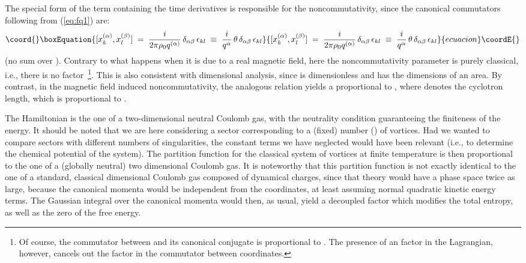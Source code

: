 \documentclass[a4paper,12pt]{article} \tolerance=200
\begin{document}
The special form of the term containing the time derivatives is
responsible for the noncommutativity, since the canonical commutators
following from (\ref{eq:fq1}) are:
\begin{equation}\coord{}\boxEquation{\label{eq:canco}
[x^{(\alpha)}_k , x^{(\beta)}_l] \;=\; \frac{i}{2 \pi \rho_0 q^{(\alpha)}}\, \delta_{\alpha \beta}\, \epsilon_{kl} \;\equiv\;
\frac{i}{q^{\alpha}} \, \theta \, \delta_{\alpha \beta}\,
\epsilon_{kl}
}{[x^{(\alpha)}_k , x^{(\beta)}_l] \;=\; \frac{i}{2 \pi \rho_0 q^{(\alpha)}}\, \delta_{\alpha \beta}\, \epsilon_{kl} \;\equiv\;
\frac{i}{q^{\alpha}} \, \theta \, \delta_{\alpha \beta}\,
\epsilon_{kl}
}{ecuacion}\coordE{}\end{equation}
(no sum over \myHighlight{$\alpha$}\coordHE{}). Contrary to what happens when it is due to a real
magnetic field, here the noncommutativity parameter \coordHE{}
is purely classical, i.e., there is no \myHighlight{$\hbar$}\coordHE{} factor~\footnote{Of course,
  the commutator between \coordHE{} and its canonical conjugate is
  proportional to \myHighlight{$\hbar$}\coordHE{}. The presence of an \myHighlight{$\hbar$}\coordHE{} factor in the
  Lagrangian, however, cancels out the \myHighlight{$\hbar$}\coordHE{} factor in the commutator
  between coordinates.}. This is also consistent with dimensional
analysis, since \coordHE{} is dimensionless and \coordHE{} has the dimensions
of an area. By contrast, in the magnetic field induced
noncommutativity, the analogous relation yields a \myHighlight{$\theta$}\coordHE{} proportional to
\coordHE{}, where \coordHE{} denotes the cyclotron length, which is proportional
to \coordHE{}.

The Hamiltonian \coordHE{} is the one of a two-dimensional neutral
Coulomb gas, with the neutrality condition guaranteeing the finiteness
of the energy.  It should be noted that we are here considering a
sector corresponding to a (fixed) number (\coordHE{}) of vortices. Had we
wanted to compare sectors with different numbers of singularities, the
constant terms we have neglected would have been relevant (i.e., to
determine the chemical potential of the system). The partition
function for the classical system of vortices at finite temperature is
then proportional to the one of a (globally neutral) two dimensional
Coulomb gas. It is noteworthy that this partition function is not
exactly identical to the one of a standard, classical \coordHE{}
dimensional Coulomb gas composed of dynamical charges, since that
theory would have a phase space twice as large, because the canonical
momenta would be independent from the coordinates, at least assuming
normal quadratic kinetic energy terms. The Gaussian integral over the
canonical momenta would then, as usual, yield a decoupled factor which
modifies the total entropy, as well as the zero of the free energy.
\end{document}
